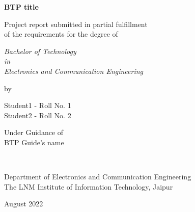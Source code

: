 \thispagestyle{empty}
\begin{center}
{\Large \bf BTP title  }


\vspace*{1.75cm}
{\large Project report submitted in partial fulfillment\\}
{\large  of the requirements for the degree of \\}

\vspace*{1cm}
{\it {\large Bachelor of Technology} \\
{\large in\\}
{\large Electronics and Communication Engineering \\}}

\vspace*{1cm}
{\large by}

\vspace*{1cm}
{\large Student1 - Roll No.  1\\}
{\large Student2 - Roll No.  2 \\}


\vspace*{5mm}
{\large Under Guidance of \\}
{\large BTP Guide's name \\}

\vspace*{1.0cm}
{\\}

\vspace*{2.0cm}
{\large Department of Electronics and Communication Engineering \\}
{\large The LNM Institute of Information Technology, Jaipur\\}

\vspace*{1.0cm}
{\large August 2022\\}
\end{center}

\clearpage
